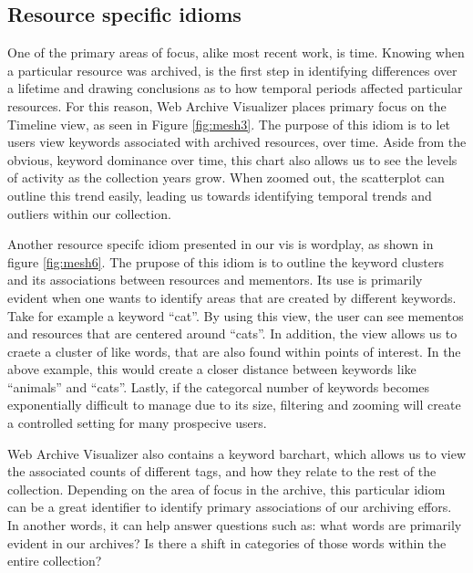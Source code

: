 \documentclass[10pt,journal,compsoc]{IEEEtran}
\begin{document}
\subsection{Resource specific idioms}
One of the primary areas of focus, alike most recent work, is time. Knowing when a particular resource was archived, is the first step in identifying differences over a lifetime and drawing conclusions as to how temporal periods affected particular resources. For this reason, Web Archive Visualizer places primary focus on the Timeline view, as seen in Figure \ref{fig:mesh3}. The purpose of this idiom is to let users view keywords associated with archived resources, over time. Aside from the obvious, keyword dominance over time, this chart also allows us to see the levels of activity as the collection years grow. When zoomed out, the scatterplot can outline this trend easily, leading us towards identifying temporal trends and outliers within our collection. \par

Another resource specifc idiom presented in our vis is wordplay, as shown in figure \ref{fig:mesh6}. The prupose of this idiom is to outline the keyword clusters and its associations between resources and mementors. Its use is primarily evident when one wants to identify areas that are created by different keywords. Take for example a keyword ``cat''. By using this view, the user can see mementos and resources that are centered around ``cats''. In addition, the view allows us to craete a cluster of like words, that are also found within points of interest. In the above example, this would create a closer distance between keywords like ``animals'' and ``cats''. Lastly, if the categorcal number of keywords becomes exponentially difficult to manage due to its size, filtering and zooming will create a controlled setting for many prospecive users. \par

Web Archive Visualizer also contains a keyword barchart, which allows us to view the associated counts of different tags, and how they relate to the rest of the collection. Depending on the area of focus in the archive, this particular idiom can be a great identifier to identify primary associations of our archiving effors. In another words, it can help answer questions such as: what words are primarily evident in our archives? Is there a shift in categories of those words within the entire collection? \par 
\end{document}
